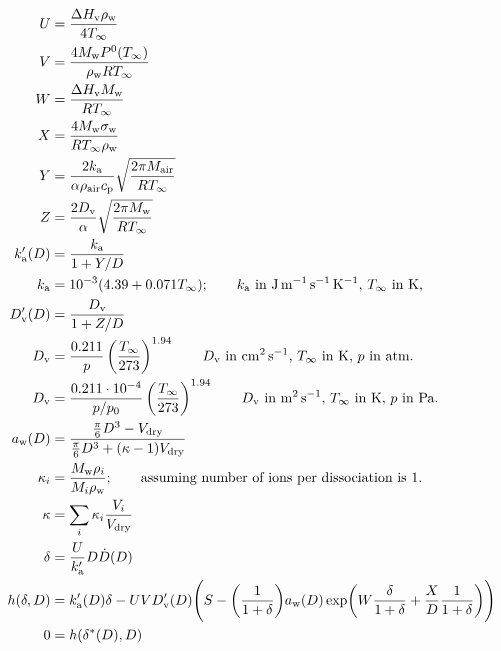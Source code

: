 \documentclass{article}
\begin{document}
\begin{align}
  U &= \frac{\Delta H_{\rm v} \rho_{\rm w}}{4 T_{\infty}} \\
  V &= \frac{4 M_{\rm w} P^{\rm 0}(T_{\infty})}{\rho_{\rm w} R T_{\infty}} \\
  W &= \frac{\Delta H_{\rm v} M_{\rm w}}{R T_{\infty}} \\
  X &= \frac{4 M_{\rm w}\sigma_{\rm w}}{R T_{\infty} \rho_{\rm w}} \\
  Y &= \frac{2 k_{\rm a}}{\alpha \rho_{\rm air} c_{\rm p}} \sqrt{\frac{2 \pi M_{\rm air}}{R T_{\infty}}} \\
  Z &= \frac{2 D_{\rm v}}{\alpha} \sqrt{\frac{2 \pi M_{\rm w}}{R T_{\infty}}} \\
  k_{\rm a}'(D) &= \frac{k_{\rm a}}{1 + Y / D} \\
  k_{\rm a} &= 10^{-3} (4.39 + 0.071  T_{\infty}); \qquad \text{$k_{\rm a}$ in $\rm J\,m^{-1}\, s^{-1} \, K^{-1}$, $T_{\infty}$ in K, }  \\
  D_{\rm v}'(D) &= \frac{D_{\rm v}}{1 + Z / D} \\
  D_{\rm v} &= \frac{0.211}{p} \left(\frac{T_{\infty}}{273}\right)^{1.94} \qquad \text{$D_{\rm v}$ in $\rm cm^2\, s^{-1}$, $T_{\infty}$ in K, $p$ in atm.}\\
  D_{\rm v} &= \frac{0.211 \cdot 10^{-4}}{p / p_0} \left(\frac{T_{\infty}}{273}\right)^{1.94} \qquad \text{$D_{\rm v}$ in $\rm m^2\, s^{-1}$, $T_{\infty}$ in K, $p$ in Pa.}\\
  a_{\rm w}(D) &= \frac{\frac{\pi}{6}D^3 - V_{\rm dry}}{\frac{\pi}{6}D^3 + (\kappa - 1) V_{\rm dry}} \label{eq:aw}\\
   \kappa_i &= \frac{M_{\rm w} \rho_{i}}{M_{i}  \rho_{\rm w}}; \qquad \text{assuming number of ions per dissociation is 1.} \label{eq:kappa_indiv}\\
   \kappa &= \sum_i \kappa_i \frac{V_i}{V_{\rm dry}} \label{eq:kappa}\\
  \delta &=\frac{U}{k_{\rm a}'} D \dot{D}(D) \label{eq:delta}\\ 
  h(\delta, D) &= k_{\rm a}'(D) \delta
  - U V D_{\rm v}'(D) \Biggl(S - \biggl(\frac{1}{1+\delta}\biggr)
  a_{\rm w}(D)
  \exp\biggl(W \frac{\delta}{1+\delta} + \frac{X}{D} \frac{1}{1+\delta}\biggr) \Biggr) \\
  0 &= h(\delta^*(D), D) \\

\end{align}
\end{document}
